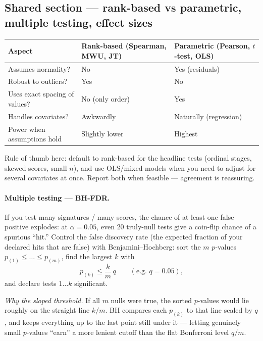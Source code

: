 \documentclass[11pt]{article}
\begin{document}
\subsection{Shared section --- rank-based vs parametric, multiple testing, effect sizes}

\begin{center}
\begin{tabular}{lll}
\toprule
Aspect & Rank-based (Spearman, MWU, JT) & Parametric (Pearson, $t$-test, OLS) \\
\midrule
Assumes normality?            & No               & Yes (residuals) \\
Robust to outliers?           & Yes              & No \\
Uses exact spacing of values? & No (only order)  & Yes \\
Handles covariates?           & Awkwardly        & Naturally (regression) \\
Power when assumptions hold   & Slightly lower   & Highest \\
\bottomrule
\end{tabular}
\end{center}

Rule of thumb here: default to rank-based for the headline tests (ordinal stages, skewed scores, small $n$), and use OLS/mixed models when you need to adjust for several covariates at once. Report both when feasible --- agreement is reassuring.

\paragraph{Multiple testing --- BH-FDR.} If you test many signatures / many scores, the chance of at least one false positive explodes: at $\alpha=0.05$, even $20$ truly-null tests give a coin-flip chance of a spurious ``hit.'' Control the false discovery rate (the expected fraction of your declared hits that are false) with Benjamini--Hochberg: sort the $m$ $p$-values $p_{(1)} \le \dots \le p_{(m)}$, find the largest $k$ with
\[
p_{(k)} \le \frac{k}{m}\,q \qquad (\text{e.g.\ } q = 0.05),
\]
and declare tests $1\dots k$ significant.

\emph{Why the sloped threshold.} If all $m$ nulls were true, the sorted $p$-values would lie roughly on the straight line $k/m$. BH compares each $p_{(k)}$ to that line scaled by $q$, and keeps everything up to the last point still under it --- letting genuinely small $p$-values ``earn'' a more lenient cutoff than the flat Bonferroni level $q/m$.
\end{document}
